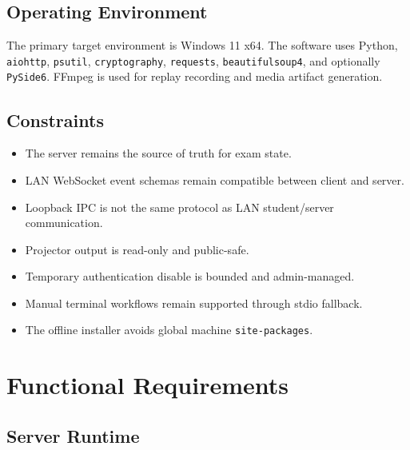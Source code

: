 \documentclass[12pt,a4paper]{article}
\begin{document}
\subsection{Operating Environment}

The primary target environment is Windows 11 x64. The software uses Python,
\texttt{aiohttp}, \texttt{psutil}, \texttt{cryptography}, \texttt{requests},
\texttt{beautifulsoup4}, and optionally \texttt{PySide6}. FFmpeg is used for
replay recording and media artifact generation.

\subsection{Constraints}

\begin{itemize}
    \item The server remains the source of truth for exam state.
    \item LAN WebSocket event schemas remain compatible between client and server.
    \item Loopback IPC is not the same protocol as LAN student/server communication.
    \item Projector output is read-only and public-safe.
    \item Temporary authentication disable is bounded and admin-managed.
    \item Manual terminal workflows remain supported through stdio fallback.
    \item The offline installer avoids global machine \texttt{site-packages}.
\end{itemize}

\section{Functional Requirements}

\subsection{Server Runtime}
\end{document}
